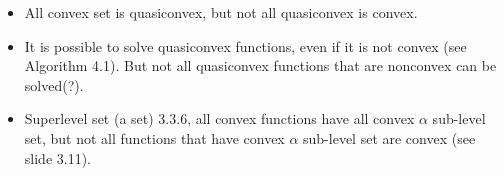 \documentclass{article}
\begin{document}
\begin{itemize}
    \item All convex set is quasiconvex, but not all quasiconvex is convex.
    \item It is possible to solve quasiconvex functions, even if it is not convex (see Algorithm 4.1). But not all quasiconvex functions that are nonconvex can be solved(?).
    \item Superlevel set (a set) 3.3.6, all convex functions have all convex \(\alpha\) sub-level set, but not all functions that have convex \(\alpha\) sub-level set are convex (see slide 3.11).
\end{itemize}
\end{document}
